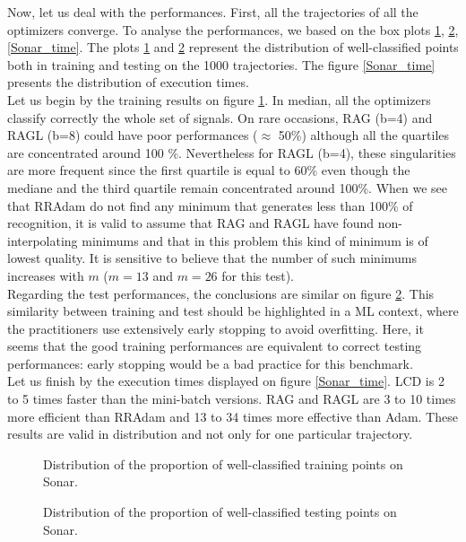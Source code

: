 Now, let us deal with the performances. First, all the trajectories of all the optimizers converge. To analyse the performances, we based on the box plots \ref{Sonar_train}, \ref{Sonar_test}, \ref{Sonar_time}. The plots \ref{Sonar_train} and \ref{Sonar_test} represent the distribution of well-classified points both in training and testing on the 1000 trajectories. The figure \ref{Sonar_time} presents the distribution of execution times. \\
Let us begin by the training results on figure \ref{Sonar_train}. In median, all the optimizers classify correctly the whole set of signals. On rare occasions, RAG (b=4) and RAGL (b=8) could have poor performances ($\approx$ 50\%) although all the quartiles are concentrated around 100 \%. Nevertheless for RAGL (b=4), these singularities are more frequent since the first quartile is equal to 60\% even though the mediane and the third quartile remain concentrated around 100\%. When we see that RRAdam do not find any minimum that generates less than 100\% of recognition, it is valid to assume that RAG and RAGL have found non-interpolating minimums and that in this problem this kind of minimum is of lowest quality. It is sensitive to believe that the number of such minimums increases with $m$ ($m=13$ and $m=26$ for this test).\\
Regarding the test performances, the conclusions are similar on figure \ref{Sonar_test}. This similarity between training and test should be highlighted in a ML context, where the practitioners use extensively early stopping to avoid overfitting. Here, it seems that the good training performances are equivalent to correct testing performances:  early stopping would be a bad practice for this benchmark. \\
Let us finish by the execution times displayed on figure \ref{Sonar_time}. LCD is 2 to 5 times faster than the mini-batch versions. RAG and RAGL are 3 to 10 times more efficient
than RRAdam and 13 to 34 times more effective than Adam. These results are valid in distribution and not only for one particular trajectory. %

\begin{figure}[h!]
	\centering
	\scalebox{0.7}{}
	\caption{Distribution of the proportion of well-classified training points on Sonar.}
	\label{Sonar_train}
\end{figure}

\begin{figure}[h!]
	\centering
	\scalebox{0.7}{}
	\caption{Distribution of the proportion of well-classified testing points on Sonar.}
	\label{Sonar_test}
\end{figure}

